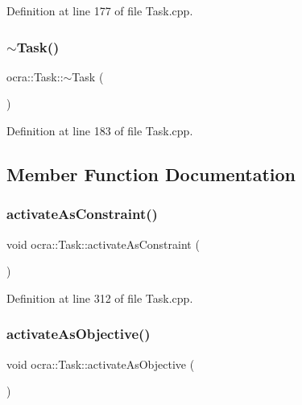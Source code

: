 Definition at line 177 of file Task.\+cpp.

\hypertarget{classocra_1_1Task_a3949d2c52bc43f373b8cc039da304b87}{}\label{classocra_1_1Task_a3949d2c52bc43f373b8cc039da304b87} 
\subsubsection{\texorpdfstring{$\sim$\+Task()}{~Task()}}
{\footnotesize\ttfamily ocra\+::\+Task\+::$\sim$\+Task (\begin{DoxyParamCaption}{ }\end{DoxyParamCaption})\hspace{0.3cm}{\ttfamily [virtual]}}



Definition at line 183 of file Task.\+cpp.



\subsection{Member Function Documentation}
\hypertarget{classocra_1_1Task_a4f7b62e14ba71899991eaf4522d31a90}{}\label{classocra_1_1Task_a4f7b62e14ba71899991eaf4522d31a90} 
\subsubsection{\texorpdfstring{activate\+As\+Constraint()}{activateAsConstraint()}}
{\footnotesize\ttfamily void ocra\+::\+Task\+::activate\+As\+Constraint (\begin{DoxyParamCaption}{ }\end{DoxyParamCaption})}



Definition at line 312 of file Task.\+cpp.

\hypertarget{classocra_1_1Task_a30cf51c067e6bac56a7b2184fa880bbe}{}\label{classocra_1_1Task_a30cf51c067e6bac56a7b2184fa880bbe} 
\subsubsection{\texorpdfstring{activate\+As\+Objective()}{activateAsObjective()}}
{\footnotesize\ttfamily void ocra\+::\+Task\+::activate\+As\+Objective (\begin{DoxyParamCaption}{ }\end{DoxyParamCaption})}



